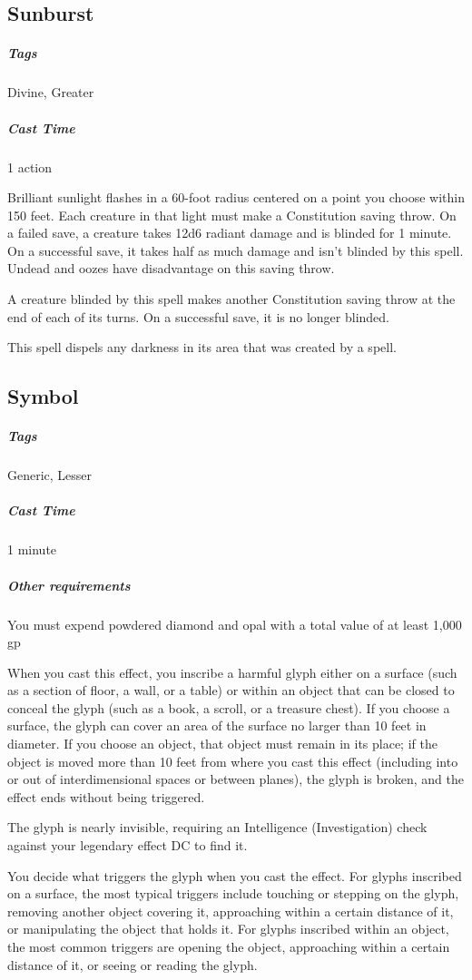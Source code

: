 \subsection{Sunburst}
\subparagraph*{Tags} Divine, Greater
\subparagraph*{Cast Time} 1 action

Brilliant sunlight flashes in a 60-foot radius centered on a point you choose within 150 feet. Each creature in that light must make a Constitution saving throw. On a failed save, a creature takes 12d6 radiant damage and is blinded for 1 minute. On a successful save, it takes half as much damage and isn’t blinded by this spell. Undead and oozes have disadvantage on this saving throw.

A creature blinded by this spell makes another Constitution saving throw at the end of each of its turns. On a successful save, it is no longer blinded.

This spell dispels any darkness in its area that was created by a spell.

\subsection{Symbol}
\subparagraph*{Tags} Generic, Lesser
\subparagraph*{Cast Time} 1 minute
\subparagraph*{Other requirements} You must expend powdered diamond and opal with a total value of at least 1,000 gp

When you cast this effect, you inscribe a harmful glyph either on a surface (such as a section of floor, a wall, or a table) or within an object that can be closed to conceal the glyph (such as a book, a scroll, or a treasure chest). If you choose a surface, the glyph can cover an area of the surface no larger than 10 feet in diameter. If you choose an object, that object must remain in its place; if the object is moved more than 10 feet from where you cast this effect (including into or out of interdimensional spaces or between planes), the glyph is broken, and the effect ends without being triggered.

The glyph is nearly invisible, requiring an Intelligence (Investigation) check against your legendary effect DC to find it.

You decide what triggers the glyph when you cast the effect. For glyphs inscribed on a surface, the most typical triggers include touching or stepping on the glyph, removing another object covering it, approaching within a certain distance of it, or manipulating the object that holds it. For glyphs inscribed within an object, the most common triggers are opening the object, approaching within a certain distance of it, or seeing or reading the glyph.

